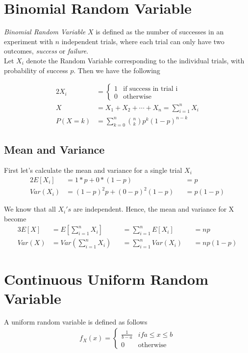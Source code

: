 \documentclass[../probability-notes.tex]{subfiles}
\begin{document}
    \section{Binomial Random Variable}
    \emph{Binomial Random Variable} $X$ is defined as the number of successes in an experiment with $n$ independent trials, where each trial can only have two outcomes, \emph{success} or \emph{failure}.\\
    Let $X_{i}$ denote the Random Variable corresponding to the individual trials, with probability of success $p$. Then we have the following

    \begin{alignat*}{2}
        X_{i} &= \begin{cases} 1 &\mbox{if success in trial i}\\ 
                                0 &\mbox{otherwise} \end{cases} \tag*{indicator variable} \\
        X &= X_{1} + X_{2} + \cdots + X_{n} = \sum_{i=1}^{n} X_{i} \\
        P(X=k) &= \sum_{k=0}^{n} \binom{n}{k} p^{k} (1 - p)^{n-k}
    \end{alignat*}

    \subsection{Mean and Variance}
    First let's calculate the mean and variance for a single trial $X_{i}$
    \begin{alignat*}{2}
        E[X_{i}] &= 1 * p + 0 * (1 - p) &&= p\\
        Var(X_{i}) &= (1 - p)^{2}p + (0-p)^{2}(1-p) &&= p(1-p)
    \end{alignat*}
    
    We know that all $X_{i}'s$ are independent. Hence, the mean and variance for X become
    \begin{alignat*}{3}
        E[X] &= E[\sum_{i=1}^{n} X_{i}] &&= \sum_{i=1}^{n}E[X_{i}] &&= np \\
        Var(X) &= Var(\sum_{i=1}^{n} X_{i}) &&= \sum_{i=1}^{n} Var(X_{i}) &&= np(1-p)
    \end{alignat*}

    \section{Continuous Uniform Random Variable}
    A uniform random variable is defined as follows
    \begin{align*}
        f_{X}(x) = \begin{cases} \frac{1}{b-a} &\mbox{$if a \leq x \leq b$}\\
                                    0 &\mbox{otherwise} \end{cases}
    \end{align*}
\end{document}

